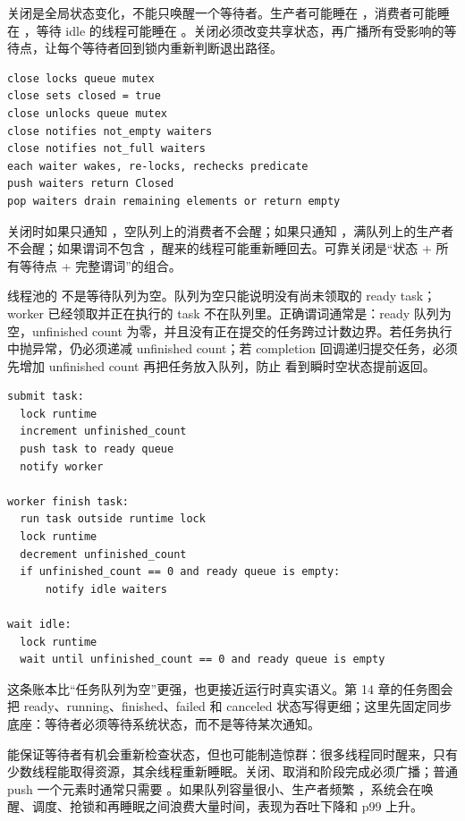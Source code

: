 关闭是全局状态变化，不能只唤醒一个等待者。生产者可能睡在 ，消费者可能睡在 ，等待 idle 的线程可能睡在 。关闭必须改变共享状态，再广播所有受影响的等待点，让每个等待者回到锁内重新判断退出路径。

\begin{lstlisting}[numbers=none,caption={队列关闭的语义事件链}]
close locks queue mutex
close sets closed = true
close unlocks queue mutex
close notifies not_empty waiters
close notifies not_full waiters
each waiter wakes, re-locks, rechecks predicate
push waiters return Closed
pop waiters drain remaining elements or return empty
\end{lstlisting}

关闭时如果只通知 ，空队列上的消费者不会醒；如果只通知 ，满队列上的生产者不会醒；如果谓词不包含 ，醒来的线程可能重新睡回去。可靠关闭是“状态 + 所有等待点 + 完整谓词”的组合。

线程池的  不是等待队列为空。队列为空只能说明没有尚未领取的 ready task；worker 已经领取并正在执行的 task 不在队列里。正确谓词通常是：ready 队列为空，unfinished count 为零，并且没有正在提交的任务跨过计数边界。若任务执行中抛异常，仍必须递减 unfinished count；若 completion 回调递归提交任务，必须先增加 unfinished count 再把任务放入队列，防止  看到瞬时空状态提前返回。

\begin{lstlisting}[numbers=none,caption={wait idle 的谓词账本}]
submit task:
  lock runtime
  increment unfinished_count
  push task to ready queue
  notify worker

worker finish task:
  run task outside runtime lock
  lock runtime
  decrement unfinished_count
  if unfinished_count == 0 and ready queue is empty:
      notify idle waiters

wait idle:
  lock runtime
  wait until unfinished_count == 0 and ready queue is empty
\end{lstlisting}

这条账本比“任务队列为空”更强，也更接近运行时真实语义。第 14 章的任务图会把 ready、running、finished、failed 和 canceled 状态写得更细；这里先固定同步底座：等待者必须等待系统状态，而不是等待某次通知。

 能保证等待者有机会重新检查状态，但也可能制造惊群：很多线程同时醒来，只有少数线程能取得资源，其余线程重新睡眠。关闭、取消和阶段完成必须广播；普通 push 一个元素时通常只需要 。如果队列容量很小、生产者频繁 ，系统会在唤醒、调度、抢锁和再睡眠之间浪费大量时间，表现为吞吐下降和 p99 上升。

